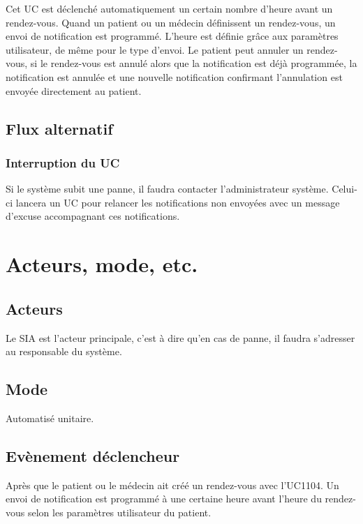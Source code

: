 Cet UC est déclenché automatiquement un certain nombre d'heure avant un rendez-vous. Quand un patient ou un médecin
définissent un rendez-vous, un envoi de notification est programmé. L'heure est
définie grâce aux paramètres utilisateur, de même
pour le type d'envoi. Le patient peut annuler un rendez-vous, si le rendez-vous est annulé alors que la notification est déjà
programmée, la notification est annulée et une nouvelle notification confirmant
l'annulation est envoyée directement au 
patient.

\subsection{Flux alternatif}

\subsubsection{Interruption du UC}

Si le système subit une panne, il faudra contacter l'administrateur système.
Celui-ci lancera un UC pour relancer les notifications non envoyées avec un message d'excuse accompagnant ces
notifications.


\section{Acteurs, mode, etc.}

\subsection{Acteurs}

Le SIA est l'acteur principale, c'est à dire qu'en cas de panne, il faudra s'adresser au 
responsable du système.

\subsection{Mode}

Automatisé unitaire.

\subsection{Evènement déclencheur}

Après que le patient ou le médecin ait créé un rendez-vous avec l'UC1104. 
Un envoi de notification est programmé à une certaine heure avant l'heure du rendez-vous selon les 
paramètres utilisateur du patient.

